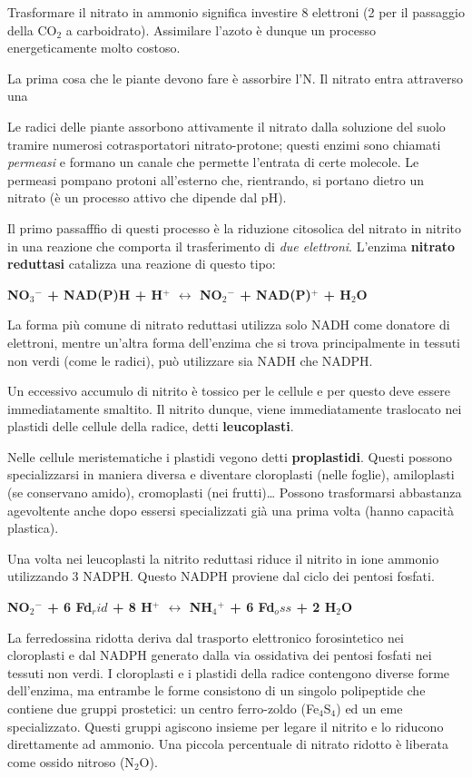 \documentclass[]{article}
\begin{document}
Trasformare il nitrato in ammonio significa investire 8 elettroni (2 per
il passaggio della CO$_2$ a carboidrato). Assimilare l'azoto è dunque un
processo energeticamente molto costoso.

La prima cosa che le piante devono fare è assorbire l'N. Il nitrato
entra attraverso una

Le radici delle piante assorbono attivamente il nitrato dalla soluzione
del suolo tramire numerosi cotrasportatori nitrato-protone; questi
enzimi sono chiamati \emph{permeasi} e formano un canale che permette
l'entrata di certe molecole. Le permeasi pompano protoni all'esterno
che, rientrando, si portano dietro un nitrato (è un processo attivo che
dipende dal pH).

Il primo passafffio di questi processo è la riduzione citosolica del
nitrato in nitrito in una reazione che comporta il trasferimento di
\emph{due elettroni}. L'enzima \textbf{nitrato reduttasi} catalizza una
reazione di questo tipo:

\textbf{NO$_3$$^-$ + NAD(P)H + H$^+$ $\longleftrightarrow$ NO$_2$$^-$ +
NAD(P)$^+$ + H$_2$O}

La forma più comune di nitrato reduttasi utilizza solo NADH come
donatore di elettroni, mentre un'altra forma dell'enzima che si trova
principalmente in tessuti non verdi (come le radici), può utilizzare sia
NADH che NADPH.

Un eccessivo accumulo di nitrito è tossico per le cellule e per questo
deve essere immediatamente smaltito. Il nitrito dunque, viene
immediatamente traslocato nei plastidi delle cellule della radice, detti
\textbf{leucoplasti}.

Nelle cellule meristematiche i plastidi vegono detti
\textbf{proplastidi}. Questi possono specializzarsi in maniera diversa e
diventare cloroplasti (nelle foglie), amiloplasti (se conservano amido),
cromoplasti (nei frutti)\ldots{} Possono trasformarsi abbastanza
agevoltente anche dopo essersi specializzati già una prima volta (hanno
capacità plastica).

Una volta nei leucoplasti la nitrito reduttasi riduce il nitrito in ione
ammonio utilizzando 3 NADPH. Questo NADPH proviene dal ciclo dei pentosi
fosfati.

\textbf{NO$_2$$^-$ + 6 Fd$_rid$ + 8 H$^+$ $\longleftrightarrow$
NH$_4$$^+$ + 6 Fd$_oss$ + 2 H$_2$O}

La ferredossina ridotta deriva dal trasporto elettronico forosintetico
nei cloroplasti e dal NADPH generato dalla via ossidativa dei pentosi
fosfati nei tessuti non verdi. I cloroplasti e i plastidi della radice
contengono diverse forme dell'enzima, ma entrambe le forme consistono di
un singolo polipeptide che contiene due gruppi prostetici: un centro
ferro-zoldo (Fe$_4$S$_4$) ed un eme specializzato. Questi gruppi
agiscono insieme per legare il nitrito e lo riducono direttamente ad
ammonio. Una piccola percentuale di nitrato ridotto è liberata come
ossido nitroso (N$_2$O).
\end{document}
